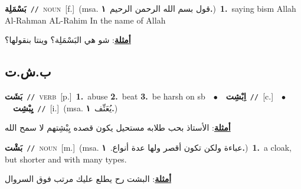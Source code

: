 \documentclass[10pt,a4paper,twoside]{article} %
\begin{document}
\begin{multicols}{2}
{\setlength\topsep{0pt}\textbf{\foreignlanguage{arabic}{بَسْمَلِة}}\ {\color{gray}\texttt{//}\color{black}}\ \textsc{noun}\ [f.]\ \color{gray}(msa. \foreignlanguage{arabic}{قول بسم الله الرحمن الرحيم}~\foreignlanguage{arabic}{\textbf{١.}})\color{black}\ \textbf{1.}~saying bism Allah Al-Rahman AL-Rahim In the name of Allah\  \begin{flushright}\color{gray}\foreignlanguage{arabic}{\textbf{\underline{\foreignlanguage{arabic}{أمثلة}}}: شو هي البَسْمَلِة؟ وينتا بنقولها؟}\end{flushright}\color{black}} \vspace{2mm}

\vspace{-3mm}
\subsection*{\color{blue}\foreignlanguage{arabic}{ب.ش.ت}\color{blue}{}} 

{\setlength\topsep{0pt}\textbf{\foreignlanguage{arabic}{بَشَت}}\ {\color{gray}\texttt{//}\color{black}}\ \textsc{verb}\ [p.]\ \textbf{1.}~abuse  \textbf{2.}~beat  \textbf{3.}~be harsh on sb\ \ $\bullet$\ \ \setlength\topsep{0pt}\textbf{\foreignlanguage{arabic}{اِبْشِت}}\ {\color{gray}\texttt{//}\color{black}}\ [c.]\ \ $\bullet$\ \ \setlength\topsep{0pt}\textbf{\foreignlanguage{arabic}{يِبْشِت}}\ {\color{gray}\texttt{//}\color{black}}\ [i.]\ \color{gray}(msa. \foreignlanguage{arabic}{يُعَنِّف}~\foreignlanguage{arabic}{\textbf{١.}})\color{black}\  \begin{flushright}\color{gray}\foreignlanguage{arabic}{\textbf{\underline{\foreignlanguage{arabic}{أمثلة}}}: الأستاذ بحب طلابه مستحيل يكون قصده يِبْشِتهم لا سمح الله}\end{flushright}\color{black}} \vspace{2mm}

{\setlength\topsep{0pt}\textbf{\foreignlanguage{arabic}{بَشْت}}\ {\color{gray}\texttt{//}\color{black}}\ \textsc{noun}\ [m.]\ \color{gray}(msa. \foreignlanguage{arabic}{عباءة ولكن تكون أقصر ولها عدة أنواع.}~\foreignlanguage{arabic}{\textbf{١.}})\color{black}\ \textbf{1.}~a cloak, but shorter and with many types.\  \begin{flushright}\color{gray}\foreignlanguage{arabic}{\textbf{\underline{\foreignlanguage{arabic}{أمثلة}}}: البشت رح يطلع عليك مرتب فوق السروال}\end{flushright}\color{black}} \vspace{2mm}


\end{multicols}
\end{document}
